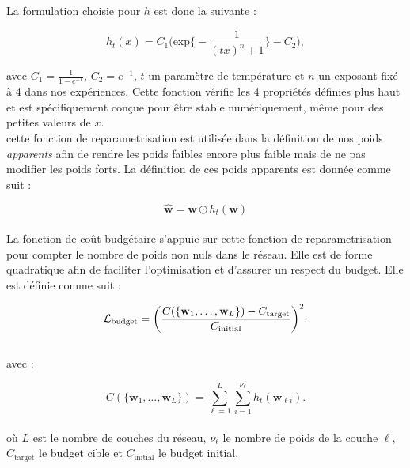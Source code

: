 \noindent La formulation choisie pour $h$ est donc la suivante :

\begin{equation}
  \label{eqn:res1:stable_h_expression}
  h_t(x) = C_1 \biggl( \text{exp} \bigg\{-\displaystyle\frac{1}{(tx)^n +1}\bigg\} - C_2 \biggr),
\end{equation}

\noindent avec $C_1=\frac{1}{1-e^{-1}}$, $C_2 = e^{-1}$, $t$ un paramètre de
température et $n$ un exposant fixé à 4 dans nos expériences. Cette fonction
vérifie les 4 propriétés définies plus haut et est spécifiquement conçue pour
être stable numériquement, même pour des petites valeurs de $x$.\\

cette fonction de reparametrisation est utilisée dans la définition de nos poids
\emph{apparents} afin de rendre les poids faibles encore plus faible mais de ne
pas modifier les poids forts. La définition de ces poids apparents est donnée
comme suit :

\begin{equation}
  \label{eqn:res1:reparametrized_weights}
  \hat{\mathbf{w}} = \mathbf{w} \odot h_t(\mathbf{w})
\end{equation}\\

La fonction de coût budgétaire s'appuie sur cette fonction de reparametrisation
pour compter le nombre de poids non nuls dans le réseau. Elle est de forme
quadratique afin de faciliter l'optimisation et d'assurer un respect du budget.
Elle est définie comme suit :

\begin{equation}
  \label{eqn:chap1:real_budget}
  {\cal L}_\text{budget} = \biggl( \displaystyle\frac{C(\{\mathbf{w}_1,\dots, \mathbf{w}_L\}) - C_\text{target}}{C_\text{initial}} \biggr)^2.
\end{equation}\\

\noindent avec :

\begin{equation}
  \label{eqn:chap1:cost_function}
  C(\{\mathbf{w}_1,\dots, \mathbf{w}_L\}) = \displaystyle \sum_{\ell=1}^{L} \sum_{i=1}^{\nu_\ell} h_t(\mathbf{w}_{\ell i}).
\end{equation} \\

\noindent où $L$ est le nombre de couches du réseau, $\nu_\ell$ le nombre de
poids de la couche $\ell$, $C_\text{target}$ le budget cible et
$C_\text{initial}$ le budget initial.\\

